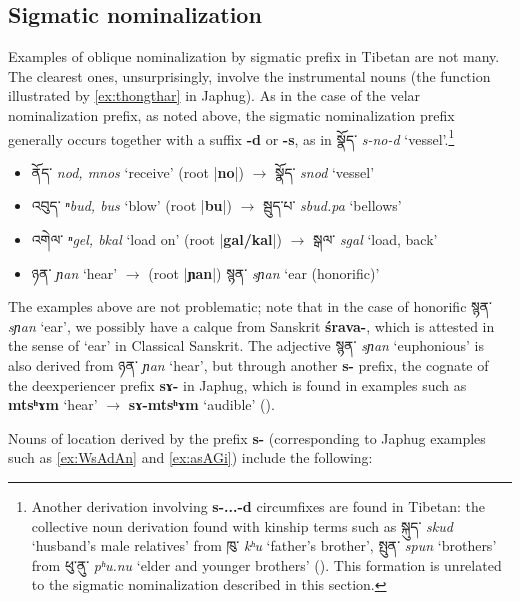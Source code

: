 \documentclass[oneside,a4paper,11pt]{article}
\newcommand{\ipa}[1]{\textbf{{\phon\mbox{#1}}}} %
\newcommand{\tibet}[3]{{\tibetain#1} \textit{\phon#2} `#3'}
\newcommand{\dhat}[1]{|\ipa{#1}|}
\begin{document}
\subsection{Sigmatic nominalization}
Examples of oblique nominalization by sigmatic prefix in Tibetan are not many. The clearest ones, unsurprisingly, involve the instrumental nouns (the function illustrated by \ref{ex:thongthar} in Japhug). As in the case of the velar nominalization prefix, as noted above, the sigmatic nominalization prefix generally occurs together with a suffix \ipa{-d} or \ipa{-s}, as in \tibet{སྣོད་}{s-no-d}{vessel}.\footnote{Another derivation involving \ipa{s-...-d}   circumfixes are found in Tibetan: the collective noun derivation found with kinship terms such as \tibet{སྐུད་}{skud}{husband's male relatives} from  \tibet{ཁུ་}{kʰu}{father's brother}, \tibet{སྤུན་}{spun}{brothers} from  \tibet{ཕུ་ནུ་}{pʰu.nu}{elder and younger brothers} (\citealt{nagano94khu}). This formation is unrelated to the sigmatic nominalization described in this section.}

\begin{itemize}
\item \tibet{ནོད་}{nod, mnos}{receive} (root \dhat{no}) $\rightarrow$	\tibet{སྣོད་}{snod}{vessel} 	
\item \tibet{འབུད་}{ⁿbud, bus}{blow} (root \dhat{bu}) $\rightarrow$	\tibet{སྦུད་པ་}{sbud.pa}{bellows} 
\item \tibet{འགེལ་}{ⁿgel, bkal}{load on} (root \dhat{gal/kal}) $\rightarrow$	\tibet{སྒལ་}{sgal}{load, back} 
\item \tibet{ཉན་}{ɲan}{hear} $\rightarrow$	(root \dhat{ɲan}) \tibet{སྙན་}{sɲan}{ear (honorific)} 
\end{itemize}

The examples above are not problematic; note that in the case of honorific \tibet{སྙན་}{sɲan}{ear}, we possibly have a calque from Sanskrit \ipa{śrava-}, which is attested in the sense of `ear' in Classical Sanskrit. The adjective \tibet{སྙན་}{sɲan}{euphonious} is also derived from \tibet{ཉན་}{ɲan}{hear}, but through another \ipa{s-} prefix, the cognate of the deexperiencer prefix \ipa{sɤ-} in Japhug, which is found in examples such as \ipa{mtsʰɤm} `hear' $\rightarrow$  \ipa{sɤ-mtsʰɤm} `audible' (\citealt{jacques12demotion}).

Nouns of location derived by the prefix \ipa{s-} (corresponding to Japhug examples such as \ref{ex:WsAdAn} and \ref{ex:asAGi}) include the following:
\end{document}
